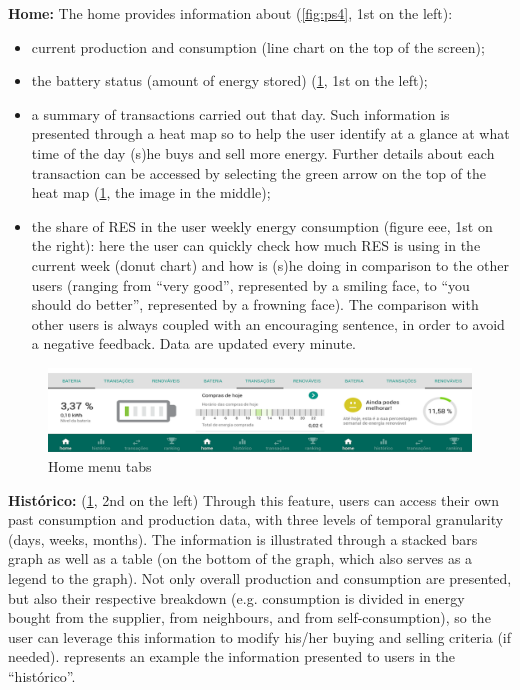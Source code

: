 \textbf{Home:}
The home provides information about (\cref{fig:ps4}, 1st on the left):
\begin{itemize}
    \item current production and consumption (line chart on the top of the screen);
    \item the battery status (amount of energy stored) (\cref{fig:ps5}, 1st on the left);
    \item a summary of transactions carried out that day. Such information is presented through a heat map so to help the user identify at a glance at what time of the day (s)he buys and sell more energy. Further details about each transaction can be accessed by selecting the green arrow on the top of the heat map (\cref{fig:ps5}, the image in the middle);
    \item the share of RES in the user weekly energy consumption (figure eee, 1st on the right): here the user can quickly check how much RES is using in the current week (donut chart) and how is (s)he doing in comparison to the other users (ranging from “very good”, represented by a smiling face, to “you should do better”, represented by a frowning face). The comparison with other users is always coupled with an encouraging sentence, in order to avoid a negative feedback. Data are updated every minute.
\end{itemize}

\begin{figure}[h]
\centering
\includegraphics[width=1\textwidth]{./Images/ps5}
\caption{Home menu tabs}
\label{fig:ps5}
\end{figure}
\textbf{Histórico:} (\cref{fig:ps5}, 2nd on the left)
Through this feature, users can access their own past consumption and production data, with three levels of temporal granularity (days, weeks, months). The information is illustrated through a stacked bars graph as well as a table (on the bottom of the graph, which also serves as a legend to the graph). Not only overall production and consumption are presented, but also their respective breakdown (e.g. consumption is divided in energy bought from the supplier, from neighbours, and from self-consumption), so the user can leverage this information to modify his/her buying and selling criteria (if needed).
 represents an example the information presented to users in the “histórico”.

